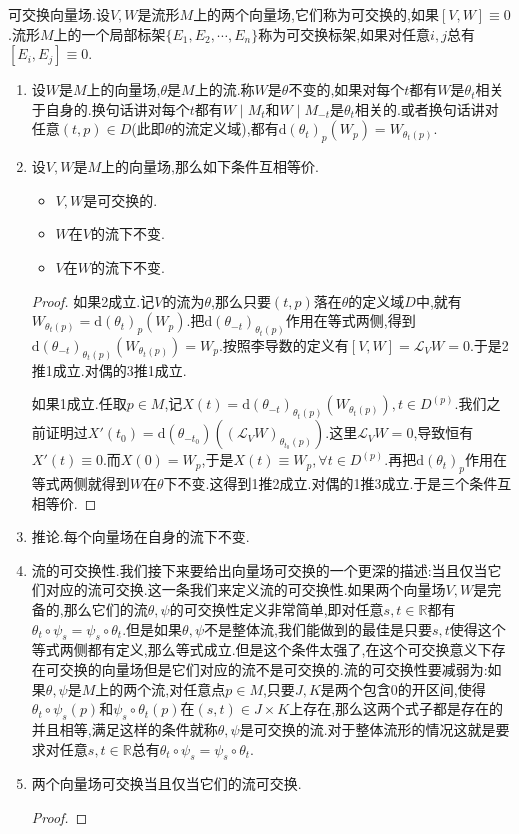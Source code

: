可交换向量场.设$V,W$是流形$M$上的两个向量场,它们称为可交换的,如果$[V,W]\equiv0$.流形$M$上的一个局部标架$\{E_1,E_2,\cdots,E_n\}$称为可交换标架,如果对任意$i,j$总有$[E_i,E_j]\equiv0$.
\begin{enumerate}
	\item 设$W$是$M$上的向量场,$\theta$是$M$上的流.称$W$是$\theta$不变的,如果对每个$t$都有$W$是$\theta_t$相关于自身的.换句话讲对每个$t$都有$W\mid M_t$和$W\mid M_{-t}$是$\theta_t$相关的.或者换句话讲对任意$(t,p)\in D$(此即$\theta$的流定义域),都有$\mathrm{d}(\theta_t)_p(W_p)=W_{\theta_t(p)}$.
	\item 设$V,W$是$M$上的向量场,那么如下条件互相等价.
	\begin{itemize}
		\item $V,W$是可交换的.
		\item $W$在$V$的流下不变.
		\item $V$在$W$的流下不变.
	\end{itemize}
	\begin{proof}
		
		如果2成立.记$V$的流为$\theta$,那么只要$(t,p)$落在$\theta$的定义域$D$中,就有$W_{\theta_t(p)}=\mathrm{d}(\theta_t)_p(W_p)$.把$\mathrm{d}(\theta_{-t})_{\theta_t(p)}$作用在等式两侧,得到$\mathrm{d}(\theta_{-t})_{\theta_t(p)}(W_{\theta_t(p)})=W_p$.按照李导数的定义有$[V,W]=\mathscr{L}_VW=0$.于是2推1成立.对偶的3推1成立.
		
		如果1成立.任取$p\in M$,记$X(t)=\mathrm{d}(\theta_{-t})_{\theta_t(p)}(W_{\theta_t(p)}),t\in D^{(p)}$.我们之前证明过$X'(t_0)=\mathrm{d}(\theta_{-t_0})((\mathscr{L}_VW)_{\theta_{t_0}(p)})$.这里$\mathscr{L}_VW=0$,导致恒有$X'(t)\equiv0$.而$X(0)=W_p$,于是$X(t)\equiv W_p,\forall t\in D^{(p)}$.再把$\mathrm{d}(\theta_t)_p$作用在等式两侧就得到$W$在$\theta$下不变.这得到1推2成立.对偶的1推3成立.于是三个条件互相等价.
	\end{proof}
	\item 推论.每个向量场在自身的流下不变.
	\item 流的可交换性.我们接下来要给出向量场可交换的一个更深的描述:当且仅当它们对应的流可交换.这一条我们来定义流的可交换性.如果两个向量场$V,W$是完备的,那么它们的流$\theta,\psi$的可交换性定义非常简单,即对任意$s,t\in\mathbb{R}$都有$\theta_t\circ\psi_s=\psi_s\circ\theta_t$.但是如果$\theta,\psi$不是整体流,我们能做到的最佳是只要$s,t$使得这个等式两侧都有定义,那么等式成立.但是这个条件太强了,在这个可交换意义下存在可交换的向量场但是它们对应的流不是可交换的.流的可交换性要减弱为:如果$\theta,\psi$是$M$上的两个流,对任意点$p\in M$,只要$J,K$是两个包含0的开区间,使得$\theta_t\circ\psi_s(p)$和$\psi_s\circ\theta_t(p)$在$(s,t)\in J\times K$上存在,那么这两个式子都是存在的并且相等,满足这样的条件就称$\theta,\psi$是可交换的流.对于整体流形的情况这就是要求对任意$s,t\in\mathbb{R}$总有$\theta_t\circ\psi_s=\psi_s\circ\theta_t$.
	\item 两个向量场可交换当且仅当它们的流可交换.
	\begin{proof}
		

\end{proof}
\end{enumerate}
